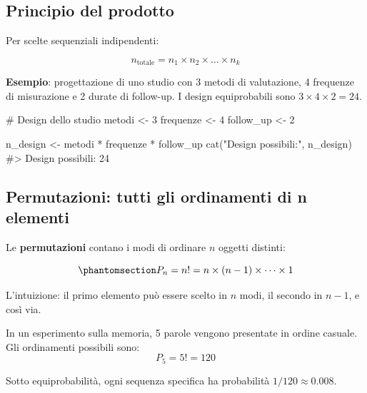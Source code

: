 \documentclass[
  letterpaper,
  DIV=11,
  numbers=noendperiod,
  oneside]{scrreprt}
\newenvironment{Shaded}{\begin{snugshade}}{\end{snugshade}}
\newcommand{\CommentTok}[1]{\textcolor[rgb]{0.37,0.37,0.37}{#1}}
\newcommand{\DecValTok}[1]{\textcolor[rgb]{0.68,0.00,0.00}{#1}}
\newcommand{\FunctionTok}[1]{\textcolor[rgb]{0.28,0.35,0.67}{#1}}
\newcommand{\NormalTok}[1]{\textcolor[rgb]{0.00,0.23,0.31}{#1}}
\newcommand{\OtherTok}[1]{\textcolor[rgb]{0.00,0.23,0.31}{#1}}
\newcommand{\SpecialCharTok}[1]{\textcolor[rgb]{0.37,0.37,0.37}{#1}}
\newcommand{\StringTok}[1]{\textcolor[rgb]{0.13,0.47,0.30}{#1}}
\theoremstyle{definition}
\theoremstyle{plain}
\theoremstyle{definition}
\theoremstyle{remark}
\begin{document}
\subsection{Principio del prodotto}\label{principio-del-prodotto}

Per scelte sequenziali indipendenti:

\[
n_{\text{totale}} = n_1 \times n_2 \times \dots \times n_k
\]

\textbf{Esempio}: progettazione di uno studio con 3 metodi di
valutazione, 4 frequenze di misurazione e 2 durate di follow-up. I
design equiprobabili sono \(3 \times 4 \times 2 = 24\).

\begin{Shaded}
\begin{Highlighting}[]
\CommentTok{\# Design dello studio}
\NormalTok{metodi }\OtherTok{\textless{}{-}} \DecValTok{3}
\NormalTok{frequenze }\OtherTok{\textless{}{-}} \DecValTok{4}
\NormalTok{follow\_up }\OtherTok{\textless{}{-}} \DecValTok{2}

\NormalTok{n\_design }\OtherTok{\textless{}{-}}\NormalTok{ metodi }\SpecialCharTok{*}\NormalTok{ frequenze }\SpecialCharTok{*}\NormalTok{ follow\_up}
\FunctionTok{cat}\NormalTok{(}\StringTok{"Design possibili:"}\NormalTok{, n\_design)}
\CommentTok{\#\textgreater{} Design possibili: 24}
\end{Highlighting}
\end{Shaded}

\subsection{Permutazioni: tutti gli ordinamenti di n
elementi}\label{permutazioni-tutti-gli-ordinamenti-di-n-elementi}

Le \textbf{permutazioni} contano i modi di ordinare \(n\) oggetti
distinti:

\begin{equation}\phantomsection\label{eq-permutations-def}{
P_n = n! = n \times (n-1) \times \cdots \times 1
}\end{equation}

L'intuizione: il primo elemento può essere scelto in \(n\) modi, il
secondo in \(n-1\), e così via.

\begin{tcolorbox}[enhanced jigsaw, arc=.35mm, breakable, colbacktitle=quarto-callout-note-color!10!white, opacityback=0, toprule=.15mm, rightrule=.15mm, colback=white, opacitybacktitle=0.6, leftrule=.75mm, coltitle=black, bottomtitle=1mm, left=2mm, toptitle=1mm, title=\textcolor{quarto-callout-note-color}{\faInfo}\hspace{0.5em}{Esempio: ordine di presentazione degli stimoli}, titlerule=0mm, bottomrule=.15mm, colframe=quarto-callout-note-color-frame]

In un esperimento sulla memoria, 5 parole vengono presentate in ordine
casuale. Gli ordinamenti possibili sono: \[
P_5 = 5! = 120
\]

Sotto equiprobabilità, ogni sequenza specifica ha probabilità
\(1/120 \approx 0.008\).

\end{tcolorbox}
\end{document}

